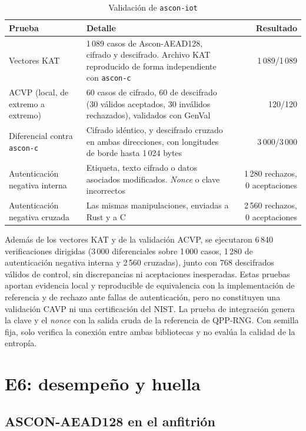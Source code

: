 \begin{table}[H]
\centering
\caption{Validación de \texttt{ascon-iot}}
\label{tab:res_ascon_validacion}
\begin{tabularx}{\textwidth}{@{}L{0.33\textwidth}Xr@{}}
\toprule
\textbf{Prueba} & \textbf{Detalle} & \textbf{Resultado} \\
\midrule
Vectores KAT & 1\,089 casos de Ascon-AEAD128, cifrado y descifrado. Archivo KAT reproducido de forma independiente con \texttt{ascon-c} & 1\,089/1\,089 \\
ACVP (local, de extremo a extremo) & 60 casos de cifrado, 60 de descifrado (30 válidos aceptados, 30 inválidos rechazados), validados con GenVal & 120/120 \\
Diferencial contra \texttt{ascon-c} & Cifrado idéntico, y descifrado cruzado en ambas direcciones, con longitudes de borde hasta 1\,024 bytes & 3\,000/3\,000 \\
Autenticación negativa interna & Etiqueta, texto cifrado o datos asociados modificados. \textit{Nonce} o clave incorrectos & 1\,280 rechazos, 0 aceptaciones \\
Autenticación negativa cruzada & Las mismas manipulaciones, enviadas a Rust y a C & 2\,560 rechazos, 0 aceptaciones \\
\bottomrule
\end{tabularx}
\end{table}

Además de los vectores KAT y de la validación ACVP, se ejecutaron 6\,840 verificaciones dirigidas (3\,000 diferenciales sobre 1\,000 casos, 1\,280 de autenticación negativa interna y 2\,560 cruzadas), junto con 768 descifrados válidos de control, sin discrepancias ni aceptaciones inesperadas. Estas pruebas aportan evidencia local y reproducible de equivalencia con la implementación de referencia y de rechazo ante fallas de autenticación, pero no constituyen una validación CAVP ni una certificación del NIST. La prueba de integración genera la clave y el \textit{nonce} con la salida cruda de la referencia de QPP-RNG. Con semilla fija, solo verifica la conexión entre ambas bibliotecas y no evalúa la calidad de la entropía.

\section{E6: desempeño y huella}
\label{sec:res_huella}

\subsection{ASCON-AEAD128 en el anfitrión}


